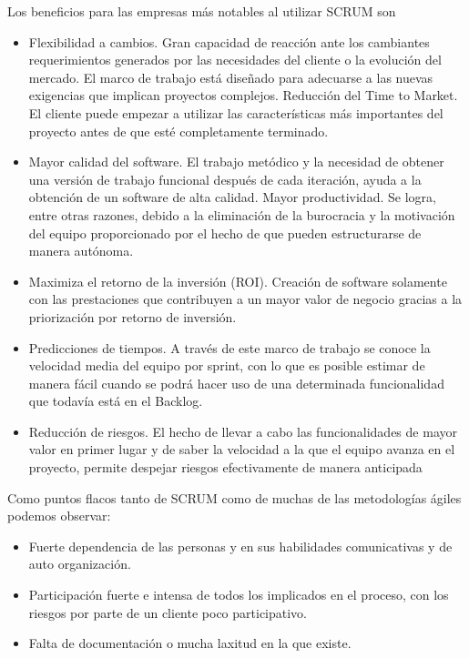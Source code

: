 \documentclass[../pfc.tex]{subfiles}
\begin{document}
	Los beneficios para las empresas más notables al utilizar SCRUM son
	
	\begin{itemize} 
		\item Flexibilidad a cambios. Gran capacidad de reacción ante los cambiantes requerimientos generados por las necesidades del cliente o la evolución del mercado. El marco de trabajo está diseñado para adecuarse a las nuevas exigencias que implican proyectos complejos.
		Reducción del Time to Market. El cliente puede empezar a utilizar las características más importantes del proyecto antes de que esté completamente terminado. 
		\item Mayor calidad del software. El trabajo metódico y la necesidad de obtener una versión de trabajo funcional después de cada iteración, ayuda a la obtención de un software de alta calidad.
		Mayor productividad. Se logra, entre otras razones, debido a la eliminación de la burocracia y la motivación del equipo proporcionado por el hecho de que pueden estructurarse de manera autónoma.
		\item Maximiza el retorno de la inversión (ROI). Creación de software solamente con las prestaciones que contribuyen a un mayor valor de negocio gracias a la priorización por retorno de inversión.
		\item Predicciones de tiempos. A través de este marco de trabajo se conoce la velocidad media del equipo por sprint, con lo que es posible estimar de manera fácil cuando se podrá hacer uso de una determinada funcionalidad que todavía está en el Backlog.
		\item Reducción de riesgos. El hecho de llevar a cabo las funcionalidades de mayor valor en primer lugar y de saber la velocidad a la que el equipo avanza en el proyecto, permite despejar riesgos efectivamente de manera anticipada
	\end{itemize}
	
	Como puntos flacos tanto de SCRUM como de muchas de las metodologías ágiles podemos observar:
	
		\begin{itemize} 
			\item Fuerte dependencia de las personas y en sus habilidades comunicativas y de auto organización.
			\item Participación fuerte e intensa de todos los implicados en el proceso, con los riesgos por parte de un cliente poco participativo.
			\item Falta de documentación o mucha laxitud en la que existe.
		\end{itemize}
\end{document}
